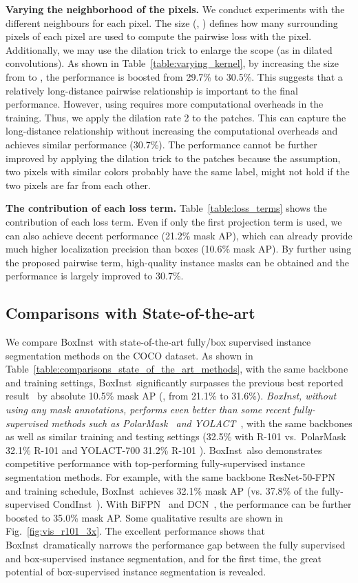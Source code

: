 \documentclass[final]{cvpr}
\newcommand{\1}{{\mathbbm{1}}}
\def\Ours{{BoxInst}\xspace}
\begin{document}
{\noindent\textbf{Varying the neighborhood  of the pixels.} We conduct experiments with the different neighbours for each pixel. The size (\ie, ) defines how many surrounding pixels of each pixel are used to compute the pairwise loss with the pixel. Additionally, we may use the dilation trick to enlarge the scope (as in dilated convolutions). As shown in Table~\ref{table:varying_kernel}, by increasing the size from  to , the performance is boosted from 29.7\% to 30.5\%. This suggests that a relatively long-distance pairwise relationship is important to the final performance. However, using  requires more computational overheads in the training. Thus, we apply the dilation rate 2 to the  patches. This can capture the long-distance relationship without increasing the computational overheads and achieves similar performance (30.7\%). The performance cannot be further improved by applying the dilation trick to the  patches because the assumption, two pixels with similar colors probably have the same label, might not hold if the two pixels are far from each other.

\noindent\textbf{The contribution of each loss term.} Table~\ref{table:loss_terms} shows the contribution of each loss term. Even if only the first projection term is used, we can also achieve decent performance (21.2\% mask AP), which can already provide much higher localization precision than boxes (10.6\% mask AP). By further using the proposed pairwise term, high-quality instance masks can be obtained and the performance is largely improved to 30.7\%.


\subsection{Comparisons with State-of-the-art}
We compare \Ours\ with state-of-the-art fully/box supervised instance segmentation methods on the COCO dataset. As shown in Table~\ref{table:comparisons_state_of_the_art_methods}, with the same backbone and training settings, \Ours\ significantly surpasses the previous best reported result~\cite{hsu2019weakly} by absolute 10.5\% mask AP (\eg, from 21.1\% to 31.6\%).
\textit{\Ours, without using any mask annotations, performs even better than some recent fully-supervised methods such as PolarMask~\cite{xie2020polarmask} and YOLACT~\cite{yolact}}, with the same backbones as well as similar training and testing settings (32.5\% with R-101  vs.\ PolarMask 32.1\% R-101  and YOLACT-700 31.2\% R-101 ). \Ours\ also demonstrates
competitive performance with top-performing
fully-supervised instance segmentation methods. For example, with the same backbone ResNet-50-FPN and  training schedule, \Ours\ achieves 32.1\% mask AP (vs. 37.8\% of the fully-supervised CondInst~\cite{tian2020conditional}). With BiFPN~\cite{EfficientDetTanPL20} and DCN~\cite{zhu2019deformable}, the performance can be further boosted to 35.0\% mask AP. Some qualitative results are shown in Fig.~\ref{fig:vis_r101_3x}. The excellent performance shows that \Ours\ dramatically
narrows the performance
gap between the fully supervised and box-supervised instance segmentation, and for the first time, the great potential of box-supervised instance segmentation is revealed.


}
\end{document}
